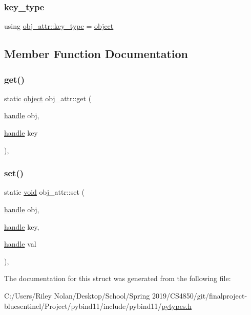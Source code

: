\subsubsection{\texorpdfstring{key\_type}{key\_type}}
{\footnotesize\ttfamily using \mbox{\hyperlink{structobj__attr_a6e74a19f662e54a2b5e5104d32cbaeb9}{obj\+\_\+attr\+::key\+\_\+type}} =  \mbox{\hyperlink{classobject}{object}}}



\subsection{Member Function Documentation}
\mbox{\label{structobj__attr_a3b7c2c8831bed4aa4c058e2252b8c12f}} 
\subsubsection{\texorpdfstring{get()}{get()}}
{\footnotesize\ttfamily static \mbox{\hyperlink{classobject}{object}} obj\+\_\+attr\+::get (\begin{DoxyParamCaption}\item[{\mbox{\hyperlink{classhandle}{handle}}}]{obj,  }\item[{\mbox{\hyperlink{classhandle}{handle}}}]{key }\end{DoxyParamCaption})\hspace{0.3cm}{\ttfamily [inline]}, {\ttfamily [static]}}

\mbox{\label{structobj__attr_a16b65196c72f9a16bc85232aa3383b3b}} 
\subsubsection{\texorpdfstring{set()}{set()}}
{\footnotesize\ttfamily static \mbox{\hyperlink{_s_d_l__opengles2__gl2ext_8h_ae5d8fa23ad07c48bb609509eae494c95}{void}} obj\+\_\+attr\+::set (\begin{DoxyParamCaption}\item[{\mbox{\hyperlink{classhandle}{handle}}}]{obj,  }\item[{\mbox{\hyperlink{classhandle}{handle}}}]{key,  }\item[{\mbox{\hyperlink{classhandle}{handle}}}]{val }\end{DoxyParamCaption})\hspace{0.3cm}{\ttfamily [inline]}, {\ttfamily [static]}}



The documentation for this struct was generated from the following file\+:\begin{DoxyCompactItemize}
\item 
C\+:/\+Users/\+Riley Nolan/\+Desktop/\+School/\+Spring 2019/\+C\+S4850/git/finalproject-\/bluesentinel/\+Project/pybind11/include/pybind11/\mbox{\hyperlink{pytypes_8h}{pytypes.\+h}}\end{DoxyCompactItemize}
